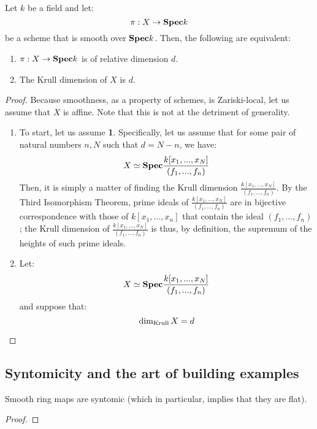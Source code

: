                 \begin{proposition} \label{prop: dimensions_of_smoothn_morphisms_over_fields}
                    Let $k$ be a field and let:
                        $$\pi: X \to \mathbf{Spec} k$$
                    be a scheme that is smooth over $\mathbf{Spec} k$. Then, the following are equivalent:
                        \begin{enumerate}
                            \item $\pi: X \to \mathbf{Spec} k$ is of relative dimension $d$. 
                            \item The Krull dimension of $X$ is $d$. 
                        \end{enumerate}
                \end{proposition}
                    \begin{proof}
                        Because smoothness, as a property of schemes, is Zariski-local, let us assume that $X$ is affine. Note that this is not at the detriment of generality. 
                        \begin{enumerate}
                            \item To start, let us assume \textbf{1}. Specifically, let us assume that for some pair of natural numbers $n, N$ such that $d = N - n$, we have:
                                $$X \simeq \mathbf{Spec} \frac{k[x_1, ..., x_N]}{(f_1, ...,f_n)}$$
                            Then, it is simply a matter of finding the Krull dimension $\frac{k[x_1, ..., x_N]}{(f_1, ...,f_n)}$. By the Third Isomorphism Theorem, prime ideals of $\frac{k[x_1, ..., x_N]}{(f_1, ...,f_n)}$ are in bijective correspondence with those of $k[x_1, ..., x_n]$ that contain the ideal $(f_1, ..., f_n)$; the Krull dimension of $\frac{k[x_1, ..., x_N]}{(f_1, ...,f_n)}$ is thus, by definition, the supremum of the heights of such prime ideals. 
                            \item Let:
                                $$X \simeq \mathbf{Spec} \frac{k[x_1, ..., x_N]}{(f_1, ..., f_n)}$$
                            and suppose that:
                                $$\dim_{\mathrm{Krull}} X = d$$
                            
                        \end{enumerate}
                    \end{proof}
        
        \subsection{Syntomicity and the art of building examples}
            \begin{proposition} \label{prop: smooth_maps_are_syntomic}
                Smooth ring maps are syntomic (which in particular, implies that they are flat).
            \end{proposition}
                \begin{proof}
                    
                \end{proof}
        

